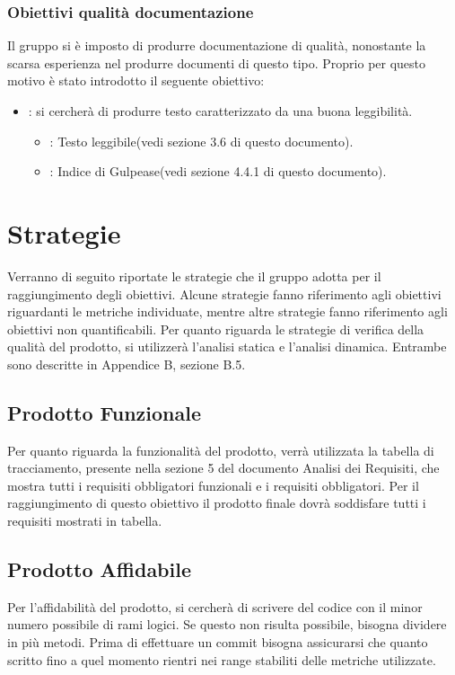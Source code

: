 \subsubsection{Obiettivi qualità documentazione}
Il gruppo \NomeGruppo{} si è imposto di produrre documentazione di qualità, nonostante la scarsa esperienza nel produrre documenti di questo tipo. Proprio per questo motivo è stato introdotto il seguente obiettivo:
\begin{itemize}
\item {}: si cercherà di produrre testo caratterizzato da una buona leggibilità.
\begin{itemize}
\item {}: Testo leggibile(vedi sezione 3.6 di questo documento).
\item {}: Indice di Gulpease(vedi sezione 4.4.1 di questo documento).
\end{itemize}
\end{itemize} 

\newpage

\section{Strategie}
Verranno di seguito riportate le strategie che il gruppo adotta per il raggiungimento degli obiettivi. Alcune strategie fanno riferimento agli obiettivi riguardanti le metriche individuate, mentre altre strategie fanno riferimento agli obiettivi non quantificabili.
Per quanto riguarda le strategie di verifica della qualità del prodotto, si utilizzerà l'analisi statica e l'analisi dinamica. Entrambe sono descritte in Appendice B, sezione B.5.

\subsection{Prodotto Funzionale}
Per quanto riguarda la funzionalità del prodotto, verrà utilizzata la tabella di tracciamento, presente nella sezione 5 del documento Analisi dei Requisiti, che mostra tutti i requisiti obbligatori funzionali e i requisiti obbligatori. Per il raggiungimento di questo obiettivo il prodotto finale dovrà soddisfare tutti i requisiti mostrati in tabella.

\subsection{Prodotto Affidabile}
Per l'affidabilità del prodotto, si cercherà di scrivere del codice con il minor numero possibile di rami logici. Se questo non risulta possibile, bisogna dividere in più metodi. Prima di effettuare un commit bisogna assicurarsi che quanto scritto fino a quel momento rientri nei range stabiliti delle metriche utilizzate.

